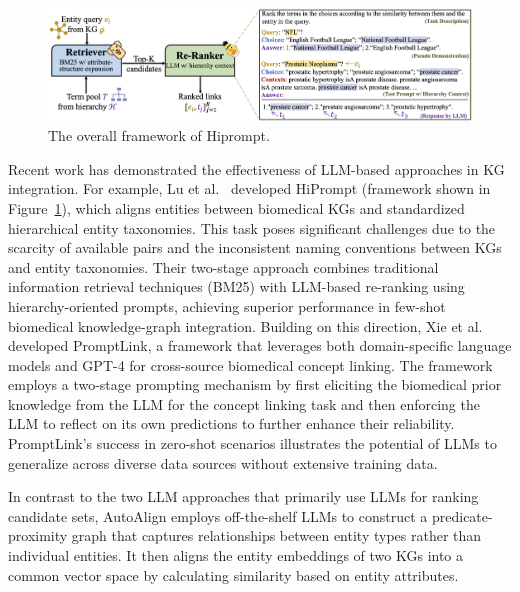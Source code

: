 \begin{figure}[htbp]
    \begin{center}
    \includegraphics[width=.95\columnwidth]{submissions/CarlYang2024/figures/hiprompt.png}
    \end{center}
    \vspace{-4mm}
    \caption{The overall framework of Hiprompt.}
    \label{fig:hiprompt}
     \vspace{-2mm}
\end{figure}

Recent work has demonstrated the effectiveness of LLM-based approaches in KG integration. 
For example, Lu et al.~\citep{lu2023hiprompt} developed HiPrompt (framework shown in Figure~\ref{fig:hiprompt}), which aligns entities between biomedical KGs and standardized hierarchical entity taxonomies. 
This task poses significant challenges due to the scarcity of available pairs and the inconsistent naming conventions between KGs and entity taxonomies.
Their two-stage approach combines traditional information retrieval techniques (BM25) with LLM-based re-ranking using hierarchy-oriented prompts, achieving superior performance in few-shot biomedical knowledge-graph integration.  
Building on this direction, Xie et al.~\citep{xie2024promptlink} developed PromptLink, a framework that leverages both domain-specific language models and GPT-4 for cross-source biomedical concept linking. The framework employs a two-stage prompting mechanism by first eliciting the biomedical prior knowledge from the LLM for the concept linking task and then enforcing the LLM to reflect on its own predictions to further enhance their reliability. 
PromptLink’s success in zero-shot scenarios illustrates the potential of LLMs to generalize across diverse data sources without extensive training data.

In contrast to the two LLM approaches that primarily use LLMs for ranking candidate sets, AutoAlign \cite{zhang2023autoalign} employs off-the-shelf LLMs to construct a predicate-proximity graph that captures relationships between entity types rather than individual entities. It then aligns the entity embeddings of two KGs into a common vector space by calculating similarity based on entity attributes.


